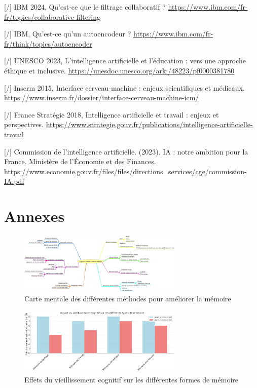 \documentclass[11pt,a4paper]{report}
\begin{document}
\begin{thebibliography}{9}
        [/] IBM 2024, Qu'est-ce que le filtrage collaboratif ? \break
        \url{https://www.ibm.com/fr-fr/topics/collaborative-filtering}
    
        [/] IBM, Qu'est-ce qu'un autoencodeur ? \break
        \url{https://www.ibm.com/fr-fr/think/topics/autoencoder}
    
        [/] UNESCO 2023, L'intelligence artificielle et l'éducation : vers une approche éthique et inclusive. \break
        \url{https://unesdoc.unesco.org/ark:/48223/pf0000381780}
    
        [/] Inserm 2015, Interface cerveau-machine : enjeux scientifiques et médicaux. \break
        \url{https://www.inserm.fr/dossier/interface-cerveau-machine-icm/}

        [/] France Stratégie 2018, Intelligence artificielle et travail : enjeux et perspectives. \break
        \url{https://www.strategie.gouv.fr/publications/intelligence-artificielle-travail}
    
        [/] Commission de l’intelligence artificielle. (2023). IA : notre ambition pour la France. Ministère de l’Économie et des Finances. \break
        \url{https://www.economie.gouv.fr/files/files/directions_services/cge/commission-IA.pdf}

\end{thebibliography}

\chapter*{Annexes}

\begin{figure}[h]
    \centering
    \includegraphics[width=0.7\textwidth]{images/1.1.1_3.jpeg}
    \caption{Carte mentale des différentes méthodes pour améliorer la mémoire}
    \label{fig:1.1.1_3}
\end{figure}

\begin{figure}[h]
    \centering
    \includegraphics[width=0.7\textwidth]{images/1.2.1_2.png}
    \caption{Effets du vieillissement cognitif sur les différentes formes de mémoire}
    \label{fig:1.2.1_2}
\end{figure}
\end{document}
